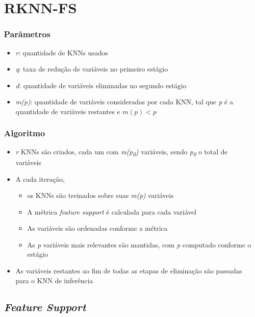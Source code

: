\section{RKNN-FS}

\begin{frame}
\frametitle{Parâmetros}
\begin{itemize}
    \item \textit{r}: quantidade de KNNs usados
    \item \textit{q}: taxa de redução de variáveis no primeiro estágio
    \item \textit{d}: quantidade de variáveis eliminadas no segundo estágio
    \item \textit{m(p)}: quantidade de variáveis consideradas por cada KNN, tal que \textit{p} é a quantidade de variáveis restantes e $ m(p) < p $
\end{itemize}
\end{frame}

\begin{frame}
\frametitle{Algoritmo}
\begin{itemize}
    \item \textit{r} KNNs são criados, cada um com \textit{m(p\textsubscript{0})} variáveis, sendo \textit{p\textsubscript{0}} o total de variáveis
    \item A cada iteração,
    \begin{itemize}
        \item os KNNs são treinados sobre suas \textit{m(p)} variáveis
        \item A métrica \textit{feature support} é calculada para cada variável
        \item As variáveis são ordenadas conforme a métrica
        \item As \textit{p} variáveis mais relevantes são mantidas, com \textit{p} computado conforme o estágio
    \end{itemize}
    \item As variáveis restantes ao fim de todas as etapas de eliminação são passadas para o KNN de inferência
\end{itemize}
\end{frame}

\subsection{\textit{Feature Support}}

